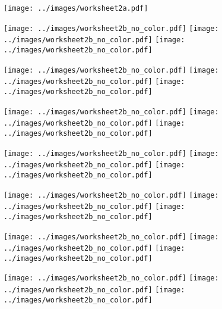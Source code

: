 \documentclass[a4paper,12pt]{article}
\begin{document}
\worksheetSubmission


\newpage

\begin{center}
\texttt{[image: ../images/worksheet2a.pdf]}
\end{center}

\newpage

\texttt{[image: ../images/worksheet2b\_no\_color.pdf]}\hfill
\texttt{[image: ../images/worksheet2b\_no\_color.pdf]}\hfill
\texttt{[image: ../images/worksheet2b\_no\_color.pdf]}

\vspace{25pt}
\texttt{[image: ../images/worksheet2b\_no\_color.pdf]}\hfill
\texttt{[image: ../images/worksheet2b\_no\_color.pdf]}\hfill
\texttt{[image: ../images/worksheet2b\_no\_color.pdf]}

\vspace{25pt}
\texttt{[image: ../images/worksheet2b\_no\_color.pdf]}\hfill
\texttt{[image: ../images/worksheet2b\_no\_color.pdf]}\hfill
\texttt{[image: ../images/worksheet2b\_no\_color.pdf]}

\vspace{25pt}
\texttt{[image: ../images/worksheet2b\_no\_color.pdf]}\hfill
\texttt{[image: ../images/worksheet2b\_no\_color.pdf]}\hfill
\texttt{[image: ../images/worksheet2b\_no\_color.pdf]}

\vspace{25pt}
\texttt{[image: ../images/worksheet2b\_no\_color.pdf]}\hfill
\texttt{[image: ../images/worksheet2b\_no\_color.pdf]}\hfill
\texttt{[image: ../images/worksheet2b\_no\_color.pdf]}


\newpage

\texttt{[image: ../images/worksheet2b\_no\_color.pdf]}\hfill
\texttt{[image: ../images/worksheet2b\_no\_color.pdf]}\hfill
\texttt{[image: ../images/worksheet2b\_no\_color.pdf]}

\vspace{25pt}
\texttt{[image: ../images/worksheet2b\_no\_color.pdf]}\hfill
\texttt{[image: ../images/worksheet2b\_no\_color.pdf]}\hfill
\texttt{[image: ../images/worksheet2b\_no\_color.pdf]}
\end{document}
